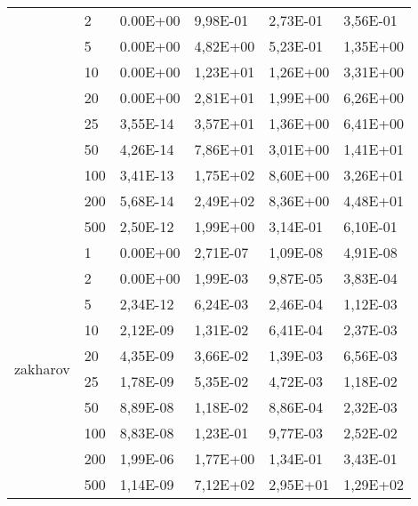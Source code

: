 \begin{longtable}[c]{|m{3.5cm}|l|l|l|l|l|}
                                        & 2         & 0.00E+00   & 9,98E-01   & 2,73E-01   & 3,56E-01  \\ \cline{2-6} 
                                        & 5         & 0.00E+00   & 4,82E+00   & 5,23E-01   & 1,35E+00  \\ \cline{2-6} 
                                        & 10        & 0.00E+00   & 1,23E+01   & 1,26E+00   & 3,31E+00  \\ \cline{2-6} 
                                        & 20        & 0.00E+00   & 2,81E+01   & 1,99E+00   & 6,26E+00  \\ \cline{2-6} 
                                        & 25        & 3,55E-14   & 3,57E+01   & 1,36E+00   & 6,41E+00  \\ \cline{2-6} 
                                        & 50        & 4,26E-14   & 7,86E+01   & 3,01E+00   & 1,41E+01  \\ \cline{2-6} 
                                        & 100       & 3,41E-13   & 1,75E+02   & 8,60E+00   & 3,26E+01  \\ \cline{2-6} 
                                        & 200       & 5,68E-14   & 2,49E+02   & 8,36E+00   & 4,48E+01  \\ \cline{2-6} 
                                        & 500       & 2,50E-12   & 1,99E+00   & 3,14E-01   & 6,10E-01  \\ \hline
\multirow{10}{*}{zakharov}              & 1         & 0.00E+00   & 2,71E-07   & 1,09E-08   & 4,91E-08  \\ \cline{2-6} 
                                        & 2         & 0.00E+00   & 1,99E-03   & 9,87E-05   & 3,83E-04  \\ \cline{2-6} 
                                        & 5         & 2,34E-12   & 6,24E-03   & 2,46E-04   & 1,12E-03  \\ \cline{2-6} 
                                        & 10        & 2,12E-09   & 1,31E-02   & 6,41E-04   & 2,37E-03  \\ \cline{2-6} 
                                        & 20        & 4,35E-09   & 3,66E-02   & 1,39E-03   & 6,56E-03  \\ \cline{2-6} 
                                        & 25        & 1,78E-09   & 5,35E-02   & 4,72E-03   & 1,18E-02  \\ \cline{2-6} 
                                        & 50        & 8,89E-08   & 1,18E-02   & 8,86E-04   & 2,32E-03  \\ \cline{2-6} 
                                        & 100       & 8,83E-08   & 1,23E-01   & 9,77E-03   & 2,52E-02  \\ \cline{2-6} 
                                        & 200       & 1,99E-06   & 1,77E+00   & 1,34E-01   & 3,43E-01  \\ \cline{2-6} 
                                        & 500       & 1,14E-09   & 7,12E+02   & 2,95E+01   & 1,29E+02  \\ \hline
\end{longtable}

